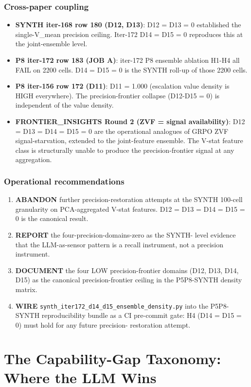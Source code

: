 \documentclass{article}
\begin{document}
\subsubsection{Cross-paper coupling}
\begin{itemize}
\item \textbf{SYNTH iter-168 row 180 (D12, D13)}: D12 = D13 = 0
established the single-V\_mean precision ceiling. Iter-172 D14 =
D15 = 0 reproduces this at the joint-ensemble level.
\item \textbf{P8 iter-172 row 183 (JOB A)}: iter-172 P8 ensemble
ablation H1-H4 all FAIL on 2200 cells. D14 = D15 = 0 is the SYNTH
roll-up of those 2200 cells.
\item \textbf{P8 iter-156 row 172 (D11)}: D11 = 1.000 (escalation
value density is HIGH everywhere). The precision-frontier collapse
(D12-D15 = 0) is independent of the value density.
\item \textbf{FRONTIER\_INSIGHTS Round 2 (ZVF = signal availability)}:
D12 = D13 = D14 = D15 = 0 are the operational analogues of GRPO
ZVF signal-starvation, extended to the joint-feature ensemble. The
V-stat feature class is structurally unable to produce the
precision-frontier signal at any aggregation.
\end{itemize}

\subsubsection{Operational recommendations}
\begin{enumerate}
\item \textbf{ABANDON} further precision-restoration attempts at
the SYNTH 100-cell granularity on PCA-aggregated V-stat features.
D12 = D13 = D14 = D15 = 0 is the canonical result.
\item \textbf{REPORT} the four-precision-domains-zero as the SYNTH-
level evidence that the LLM-as-sensor pattern is a recall
instrument, not a precision instrument.
\item \textbf{DOCUMENT} the four LOW precision-frontier domains
(D12, D13, D14, D15) as the canonical precision-frontier ceiling
in the P5P8-SYNTH density matrix.
\item \textbf{WIRE} \texttt{synth\_iter172\_d14\_d15\_ensemble\_density.py}
into the P5P8-SYNTH reproducibility bundle as a CI pre-commit
gate: H4 (D14 = D15 = 0) must hold for any future precision-
restoration attempt.
\end{enumerate}

\clearpage \section{The Capability-Gap Taxonomy: Where the LLM Wins}
\label{sec:p8-taxonomy}
\end{document}
